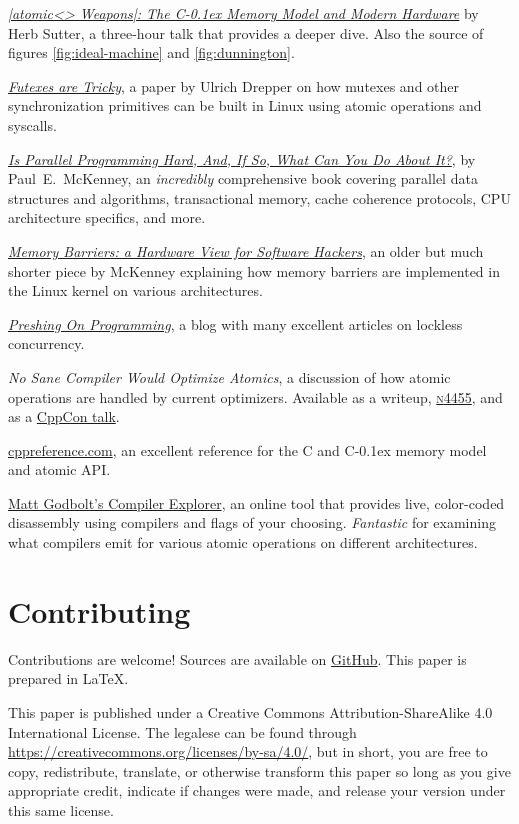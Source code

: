 \documentclass[fontsize=10pt, oneside]{scrartcl}
\newcommand{\cplusplus}[1]{C\kern-0.1ex\raisebox{0.15ex}{\texttt{++}}}
\newcommand{\clang}[1]{C}
\begin{document}
\href{https://herbsutter.com/2013/02/11/atomic-weapons-the-c-memory-model-and-modern-hardware/}{%
\textit{\cpp|atomic<> Weapons|: The \cplusplus{11} Memory Model and Modern Hardware}}
by Herb Sutter,
a three-hour talk that provides a deeper dive.
Also the source of figures \ref{fig:ideal-machine} and \ref{fig:dunnington}.

\href{https://www.akkadia.org/drepper/futex.pdf}{\textit{Futexes are Tricky}},
a paper by Ulrich Drepper on how mutexes and other synchronization primitives can be built in Linux using atomic operations and syscalls.

\href{https://www.kernel.org/pub/linux/kernel/people/paulmck/perfbook/perfbook.html}{%
\textit{Is Parallel Programming Hard, And, If So, What Can You Do About It?}},
by Paul~E.\ McKenney,
an \emph{incredibly} comprehensive book covering parallel data structures and
algorithms, transactional memory, cache coherence protocols,
\textsc{CPU} architecture specifics, and more.

\href{http://www.rdrop.com/~paulmck/scalability/paper/whymb.2010.06.07c.pdf}{%
\textit{Memory Barriers: a Hardware View for Software Hackers}},
an older but much shorter piece by McKenney explaining how memory barriers are implemented
in the Linux kernel on various architectures.

\href{https://preshing.com/archives/}{\textit{Preshing On Programming}},
a blog with many excellent articles on lockless concurrency.

\textit{No Sane Compiler Would Optimize Atomics},
a discussion of how atomic operations are handled by current optimizers.
Available as a writeup,
\href{http://www.open-std.org/jtc1/sc22/wg21/docs/papers/2015/n4455.html}{%
\textsc{n}4455}, and as a
\href{https://www.youtube.com/watch?v=IB57wIf9W1k}{CppCon talk}.

\href{https://en.cppreference.com}{cppreference.com},
an excellent reference for the \clang{} and \cplusplus{} memory model and atomic \textsc{API}.

\href{https://godbolt.org/}{Matt Godbolt's Compiler Explorer},
an online tool that provides live, color-coded disassembly using compilers and flags of your choosing.
\emph{Fantastic} for examining what compilers emit for various atomic operations on different architectures.

\section{Contributing}

Contributions are welcome!
Sources are available on
\href{https://github.com/sysprog21/concurrency-primer}{GitHub}.
This paper is prepared in \LaTeX{}.

This paper is published under a
Creative Commons Attribution-ShareAlike 4.0 International License.
The legalese can be found through
\url{https://creativecommons.org/licenses/by-sa/4.0/},
but in short,
you are free to copy, redistribute, translate, or otherwise transform this paper
so long as you give appropriate credit, indicate if changes were made,
and release your version under this same license.
\end{document}
